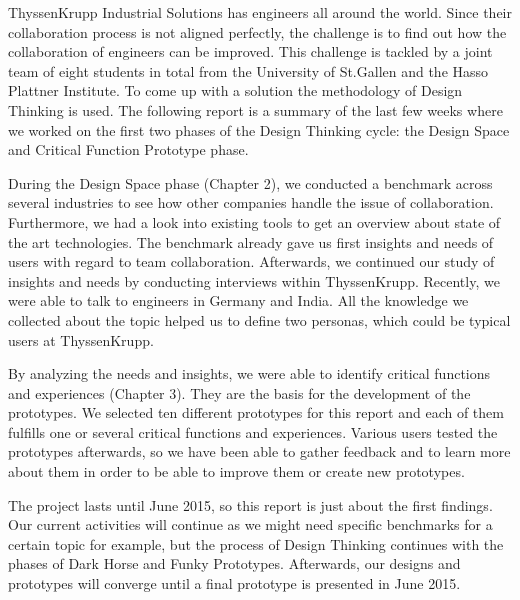 %
%


ThyssenKrupp Industrial Solutions has engineers all around the world. Since their collaboration process is not aligned perfectly, the challenge is to find out how the collaboration of engineers can be improved. This challenge is tackled by a joint team of eight students in total from the University of St.Gallen and the Hasso Plattner Institute. To come up with a solution the methodology of Design Thinking is used. The following report is a summary of the last few weeks where we worked on the first two phases of the Design Thinking cycle: the Design Space and Critical Function Prototype phase.


During the Design Space phase (Chapter 2), we conducted a benchmark across several industries to see how other companies handle the issue of collaboration. Furthermore, we had a look into existing tools to get an overview about state of the art technologies. The benchmark already gave us first insights and needs of users with regard to team collaboration. Afterwards, we continued our study of insights and needs by conducting interviews within ThyssenKrupp. Recently, we were able to talk to engineers in Germany and India. All the knowledge we collected about the topic helped us to define two personas, which could be typical users at ThyssenKrupp.


By analyzing the needs and insights, we were able to identify critical functions and experiences (Chapter 3). They are the basis for the development of the prototypes. We selected ten different prototypes for this report and each of them fulfills one or several critical functions and experiences. Various users tested the prototypes afterwards, so we have been able to gather feedback and to learn more about them in order to be able to improve them or create new prototypes.


The project lasts until June 2015, so this report is just about the first findings. Our current activities will continue as we might need specific benchmarks for a certain topic for example, but the process of Design Thinking continues with the phases of Dark Horse and Funky Prototypes. Afterwards, our designs and prototypes will converge until a final prototype is presented in June 2015.

